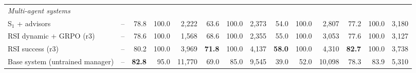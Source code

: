 \begin{table}[t]
{\begin{tabular}{l r rrr rrr rrr rrr}
\multicolumn{14}{l}{\textit{Multi-agent systems}} \\
\quad S$_1$ + advisors & -- & 78.8 & 100.0 & 2,222 & 63.6 & 100.0 & 2,373 & 54.0 & 100.0 & 2,807 & 77.2 & 100.0 & 3,180 \\
\quad RSI dynamic + GRPO (r3) & -- & 78.6 & 100.0 & 1,568 & 68.6 & 100.0 & 2,355 & 55.0 & 100.0 & 3,053 & 77.6 & 100.0 & 3,127 \\
\quad RSI success (r3) & -- & 80.2 & 100.0 & 3,969 & \textbf{71.8} & 100.0 & 4,137 & \textbf{58.0} & 100.0 & 4,310 & \textbf{82.7} & 100.0 & 3,738 \\
\quad Base system (untrained manager) & -- & \textbf{82.8} & 95.0 & 11,770 & 69.0 & 85.0 & 9,545 & 39.0 & 52.0 & 10,098 & 78.3 & 83.9 & 5,310 \\
\bottomrule
\end{tabular}}
\end{table}
